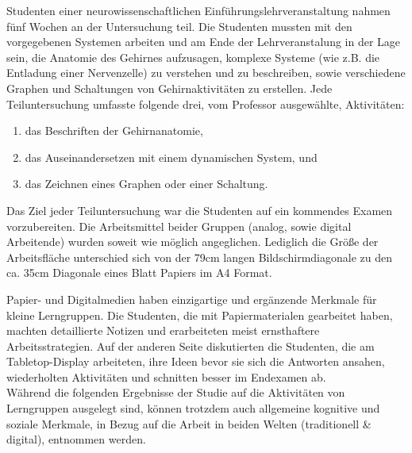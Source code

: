  Studenten einer neurowissenschaftlichen Einführungslehrveranstaltung nahmen fünf Wochen an der Untersuchung teil. Die Studenten mussten mit den vorgegebenen Systemen arbeiten und am Ende der Lehrveranstalung in der Lage sein, die Anatomie des Gehirnes aufzusagen, komplexe Systeme (wie z.B. die Entladung einer Nervenzelle) zu verstehen und zu beschreiben, sowie verschiedene Graphen und Schaltungen von Gehirnaktivitäten zu erstellen. Jede Teiluntersuchung umfasste folgende drei, vom Professor ausgewählte, Aktivitäten:
\begin{enumerate}
	\item das Beschriften der Gehirnanatomie,
	\item das Auseinandersetzen mit einem dynamischen System, und
	\item das Zeichnen eines Graphen oder einer Schaltung.
\end{enumerate}
Das Ziel jeder Teiluntersuchung war die Studenten auf ein kommendes Examen vorzubereiten. Die Arbeitsmittel beider Gruppen (analog, sowie digital Arbeitende) wurden soweit wie möglich angeglichen. Lediglich die Größe der Arbeitsfläche unterschied sich von der 79cm langen Bildschirmdiagonale zu den ca. 35cm Diagonale eines Blatt Papiers im A4 Format.

\medskip Papier- und Digitalmedien haben einzigartige und ergänzende Merkmale für kleine Lerngruppen. Die Studenten, die mit Papiermaterialen gearbeitet haben, machten detaillierte Notizen und erarbeiteten meist ernsthaftere Arbeitsstrategien. Auf der anderen Seite diskutierten die Studenten, die am Tabletop-Display arbeiteten, ihre Ideen bevor sie sich die Antworten ansahen, wiederholten Aktivitäten und schnitten besser im Endexamen ab. \citep{Piper:2009}
\\Während die folgenden Ergebnisse der Studie auf die Aktivitäten von Lerngruppen ausgelegt sind, können trotzdem auch allgemeine kognitive und soziale Merkmale, in Bezug auf die Arbeit in beiden Welten (traditionell \& digital), entnommen werden.

